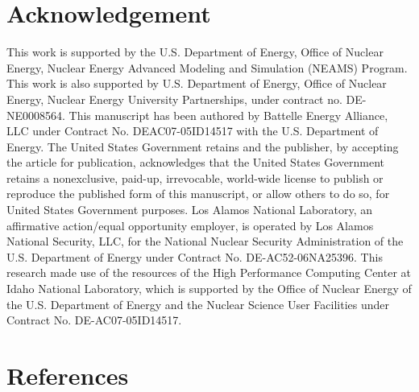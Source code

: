 \documentclass[review]{elsarticle}
\begin{document}
\section{Acknowledgement}
This work is supported by the U.S. Department of Energy, Office of Nuclear Energy, Nuclear Energy Advanced Modeling and Simulation (NEAMS) Program. This work is also supported by U.S. Department of Energy, Office of Nuclear Energy, Nuclear Energy University Partnerships, under contract no. DE-NE0008564. This manuscript has been authored by Battelle Energy Alliance, LLC under Contract No. DEAC07-05ID14517 with the U.S. Department of Energy. The United States Government retains and the publisher, by accepting the article for publication, acknowledges that the United States Government retains a nonexclusive, paid-up, irrevocable, world-wide license to publish or reproduce the published form of this manuscript, or allow others to do so, for United States Government purposes.  Los Alamos National Laboratory, an affirmative action/equal opportunity employer, is operated by Los Alamos National Security, LLC, for the National Nuclear Security Administration of the U.S. Department of Energy under Contract No. DE-AC52-06NA25396.  This research made use of the resources of the High Performance Computing Center at Idaho National Laboratory, which is supported by the Office of Nuclear Energy of the U.S. Department of Energy and the Nuclear Science User Facilities under Contract No. DE-AC07-05ID14517.

\section{References}


\end{document}
